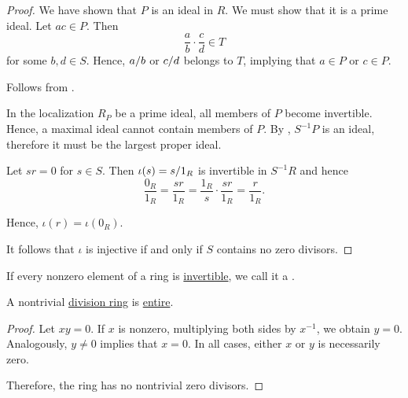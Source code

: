\begin{proof}
  We have shown that \( P \) is an ideal in \( R \). We must show that it is a prime ideal. Let \( ac \in P \). Then
  \begin{equation*}
    \frac a b \cdot \frac c d \in T
  \end{equation*}
  for some \( b, d \in S \). Hence, \( a / b \) or \( c / d \) belongs to \( T \), implying that \( a \in P \) or \( c \in P \).

   Follows from .

   In the localization \( R_P \) be a prime ideal, all members of \( P \) become invertible. Hence, a maximal ideal cannot contain members of \( P \). By , \( S^{-1} P \) is an ideal, therefore it must be the largest proper ideal.

   Let \( sr = 0 \) for \( s \in S \). Then \( \iota(s) = s / 1_R \) is invertible in \( S^{-1} R \) and hence
  \begin{equation*}
    \frac {0_R} {1_R}
    =
    \frac {sr} {1_R}
    =
    \frac {1_R} s \cdot \frac {sr} {1_R}
    =
    \frac r {1_R}.
  \end{equation*}

  Hence, \( \iota(r) = \iota(0_R) \).

  It follows that \( \iota \) is injective if and only if \( S \) contains no zero divisors.
\end{proof}

\begin{definition}\label{def:division_ring}
  If every nonzero element of a ring is \hyperref[def:divisibility/unit]{invertible}, we call it a .
\end{definition}

\begin{proposition}\label{thm:division_ring_is_entire}
  A nontrivial \hyperref[def:division_ring]{division ring} is \hyperref[def:entire_semiring]{entire}.
\end{proposition}
\begin{proof}
  Let \( xy = 0 \). If \( x \) is nonzero, multiplying both sides by \( x^{-1} \), we obtain \( y = 0 \). Analogously, \( y \neq 0 \) implies that \( x = 0 \). In all cases, either \( x \) or \( y \) is necessarily zero.

  Therefore, the ring has no nontrivial zero divisors.
\end{proof}


